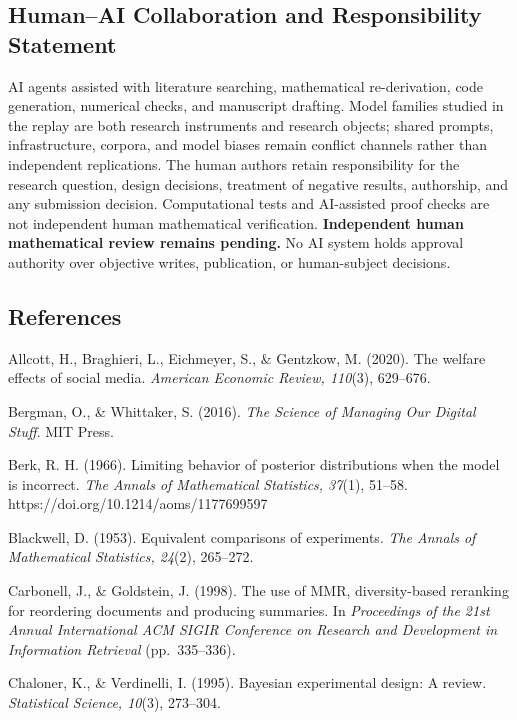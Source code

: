 \documentclass[
  11pt]{article}
\begin{document}
\subsection{Human--AI Collaboration and Responsibility
Statement}\label{humanai-collaboration-and-responsibility-statement}

AI agents assisted with literature searching, mathematical
re-derivation, code generation, numerical checks, and manuscript
drafting. Model families studied in the replay are both research
instruments and research objects; shared prompts, infrastructure,
corpora, and model biases remain conflict channels rather than
independent replications. The human authors retain responsibility for
the research question, design decisions, treatment of negative results,
authorship, and any submission decision. Computational tests and
AI-assisted proof checks are not independent human mathematical
verification. \textbf{Independent human mathematical review remains
pending.} No AI system holds approval authority over objective writes,
publication, or human-subject decisions.

\subsection{References}\label{references}

\begingroup\footnotesize

Allcott, H., Braghieri, L., Eichmeyer, S., \& Gentzkow, M. (2020). The
welfare effects of social media. \emph{American Economic Review,
110}(3), 629--676.

Bergman, O., \& Whittaker, S. (2016). \emph{The Science of Managing Our
Digital Stuff}. MIT Press.

Berk, R. H. (1966). Limiting behavior of posterior distributions when
the model is incorrect. \emph{The Annals of Mathematical Statistics,
37}(1), 51--58. https://doi.org/10.1214/aoms/1177699597

Blackwell, D. (1953). Equivalent comparisons of experiments. \emph{The
Annals of Mathematical Statistics, 24}(2), 265--272.

Carbonell, J., \& Goldstein, J. (1998). The use of MMR, diversity-based
reranking for reordering documents and producing summaries. In
\emph{Proceedings of the 21st Annual International ACM SIGIR Conference
on Research and Development in Information Retrieval} (pp.~335--336).

Chaloner, K., \& Verdinelli, I. (1995). Bayesian experimental design: A
review. \emph{Statistical Science, 10}(3), 273--304.
\end{document}

